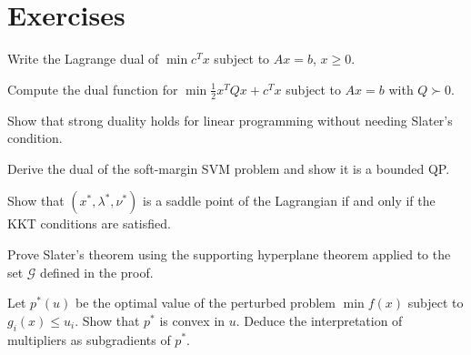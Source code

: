 \section{Exercises}

\begin{exercise}[$\star$]
Write the Lagrange dual of $\min c^Tx$ subject to $Ax = b$, $x \geq 0$.
\end{exercise}

\begin{exercise}[$\star$]
Compute the dual function for $\min \frac{1}{2}x^TQx + c^Tx$ subject to $Ax = b$
with $Q \succ 0$.
\end{exercise}

\begin{exercise}[$\star\star$]
Show that strong duality holds for linear programming without needing Slater's condition.
\end{exercise}

\begin{exercise}[$\star\star$]
Derive the dual of the soft-margin SVM problem and show it is a bounded QP.
\end{exercise}

\begin{exercise}[$\star\star$]
Show that $(x^*, \lambda^*, \nu^*)$ is a saddle point of the Lagrangian if and only
if the KKT conditions are satisfied.
\end{exercise}

\begin{exercise}[$\star\star\star$]
Prove Slater's theorem using the supporting hyperplane theorem applied to the set
$\mathcal{G}$ defined in the proof.
\end{exercise}

\begin{exercise}[$\star\star\star$]
Let $p^*(u)$ be the optimal value of the perturbed problem
$\min f(x)$ subject to $g_i(x) \leq u_i$. Show that $p^*$ is convex in $u$.
Deduce the interpretation of multipliers as subgradients of $p^*$.
\end{exercise}
